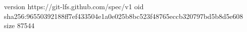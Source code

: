 version https://git-lfs.github.com/spec/v1
oid sha256:96550392188ff7ef433504e1a0e025b8bc523f48765eccb320797bd5b8d5e608
size 87544

